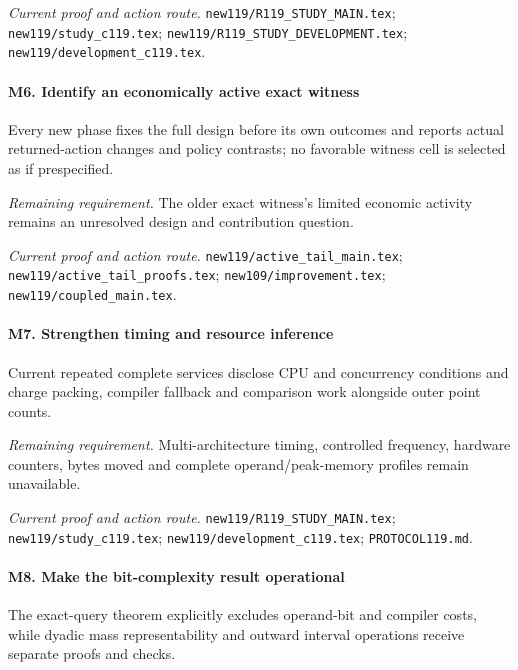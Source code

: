 \par\emph{Current proof and action route.} \nolinkurl{new119/R119_STUDY_MAIN.tex}; \nolinkurl{new119/study_c119.tex}; \nolinkurl{new119/R119_STUDY_DEVELOPMENT.tex}; \nolinkurl{new119/development_c119.tex}.

\paragraph{M6. Identify an economically active exact witness}

Every new phase fixes the full design before its own outcomes and reports actual returned-action changes and policy contrasts; no favorable witness cell is selected as if prespecified.

\par\emph{Remaining requirement.} The older exact witness's limited economic activity remains an unresolved design and contribution question.

\par\emph{Current proof and action route.} \nolinkurl{new119/active_tail_main.tex}; \nolinkurl{new119/active_tail_proofs.tex}; \nolinkurl{new109/improvement.tex}; \nolinkurl{new119/coupled_main.tex}.

\paragraph{M7. Strengthen timing and resource inference}

Current repeated complete services disclose CPU and concurrency conditions and charge packing, compiler fallback and comparison work alongside outer point counts.

\par\emph{Remaining requirement.} Multi-architecture timing, controlled frequency, hardware counters, bytes moved and complete operand/\allowbreak{}peak-memory profiles remain unavailable.

\par\emph{Current proof and action route.} \nolinkurl{new119/R119_STUDY_MAIN.tex}; \nolinkurl{new119/study_c119.tex}; \nolinkurl{new119/development_c119.tex}; \nolinkurl{PROTOCOL119.md}.

\paragraph{M8. Make the bit-complexity result operational}

The exact-query theorem explicitly excludes operand-bit and compiler costs, while dyadic mass representability and outward interval operations receive separate proofs and checks.

